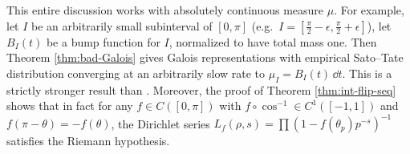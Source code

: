 This entire discussion works with absolutely continuous measure $\mu$. For 
example, let $I$ be an arbitrarily small subinterval of $[0,\pi]$ 
(e.g.~$I = \left[\frac \pi 2 - \epsilon,\frac \pi 2 + \epsilon\right]$), let 
$B_I(t)$ be a bump function for $I$, normalized to have total mass one. Then 
Theorem \ref{thm:bad-Galois} gives Galois representations with empirical 
Sato--Tate distribution converging at an arbitrarily slow rate to 
$\mu_I = B_I(t)\, \dd t$. This is a strictly stronger result than 
\cite[Th.~5.2]{pande-2011}. Moreover, the proof of Theorem 
\ref{thm:int-flip-seq} shows that in fact for any $f\in C([0,\pi])$ with 
$f\circ \cos^{-1}\in C^1([-1,1])$ and $f(\pi-\theta) = -f(\theta)$, the 
Dirichlet series 
$L_f(\rho,s) = \prod \left( 1 - f(\theta_p) p^{-s}\right)^{-1}$ satisfies the 
Riemann hypothesis. 
